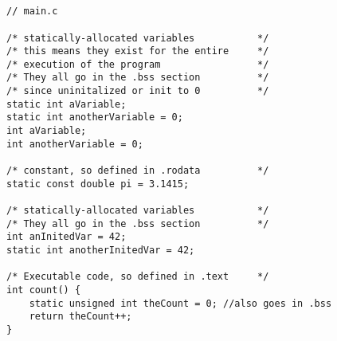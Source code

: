 {
\chapter{}\label{code:c-to-segments}
\begin{listing}[H]
	\begin{verbatim}
// main.c

/* statically-allocated variables       	*/
/* this means they exist for the entire 	*/
/* execution of the program             	*/
/* They all go in the .bss section 			*/
/* since uninitalized or init to 0			*/
static int aVariable;
static int anotherVariable = 0;
int aVariable;
int anotherVariable = 0;

/* constant, so defined in .rodata		 	*/
static const double pi = 3.1415;

/* statically-allocated variables       	*/
/* They all go in the .bss section 			*/
int anInitedVar = 42;
static int anotherInitedVar = 42;

/* Executable code, so defined in .text 	*/
int count() {
	static unsigned int theCount = 0; //also goes in .bss 
	return theCount++;
}
	\end{verbatim}
\end{listing}

}
